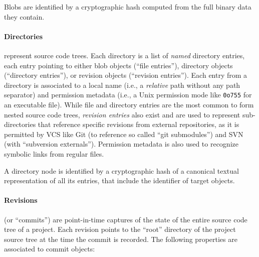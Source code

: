 Blobs are identified by a cryptographic hash computed from the full binary data
they contain.



\begin{figure}\centering
{}
\end{figure}
\paragraph{\textbf{Directories}} represent source code trees. Each directory is
a list of \emph{named} directory entries, each entry pointing to either blob
objects (``file entries''), directory objects (``directory entries''), or
revision objects (``revision entries''). Each entry from a directory is
associated to a local name (i.e., a \emph{relative} path without any path
separator) and permission metadata (i.e., a Unix permission mode like
\texttt{0o755} for an executable file). While file and directory entries are
the most common to form nested source code trees, \emph{revision entries} also
exist and are used to represent sub-directories that reference specific
revisions from external repositories, as it is permitted by VCS like Git (to
reference so called ``git submodules'') and SVN (with ``subversion
externals''). Permission metadata is also used to recognize symbolic links from
regular files.

A directory node is identified by a cryptographic hash of a canonical textual
representation of all its entries, that include the identifier of target
objects.



\begin{figure}\centering
{}
\end{figure}
\paragraph{\textbf{Revisions}} (or ``commits'') are point-in-time captures of
the state of the entire source code tree of a project. Each revision points to
the ``root'' directory of the project source tree at the time the commit is
recorded. The following properties are associated to commit objects:

